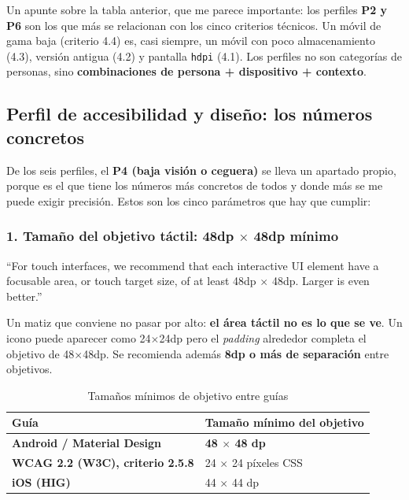 \documentclass[11pt,a4paper]{article}
\newcommand{\code}[1]{\texttt{\color{ink}#1}}
\begin{document}
	Un apunte sobre la tabla anterior, que me parece importante: los perfiles \textbf{P2 y P6} son los que más se relacionan con los cinco criterios técnicos. Un móvil de gama baja (criterio 4.4) es, casi siempre, un móvil con poco almacenamiento (4.3), versión antigua (4.2) y pantalla \code{hdpi} (4.1). Los perfiles no son categorías de personas, sino \textbf{combinaciones de persona + dispositivo + contexto}.
	
	\subsection{Perfil de accesibilidad y diseño: los números concretos}
	
	De los seis perfiles, el \textbf{P4 (baja visión o ceguera)} se lleva un apartado propio, porque es el que tiene los números más concretos de todos y donde más se me puede exigir precisión. Estos son los cinco parámetros que hay que cumplir:
	
	\subsubsection*{1. Tamaño del objetivo táctil: 48dp $\times$ 48dp mínimo}
	
	\enquote{For touch interfaces, we recommend that each interactive UI element have a focusable area, or touch target size, of at least 48dp $\times$ 48dp. Larger is even better.}
	
	Un matiz que conviene no pasar por alto: \textbf{el área táctil no es lo que se ve}. Un icono puede aparecer como 24$\times$24dp pero el \emph{padding} alrededor completa el objetivo de 48$\times$48dp. Se recomienda además \textbf{8dp o más de separación} entre objetivos.
	
	\begin{table}[htbp]
		\centering
		\small
		\begin{tabular}{@{}l l@{}}
			\toprule
			\rowcolor{primary}
			\textcolor{paper}{\sffamily\bfseries Guía} & \textcolor{paper}{\sffamily\bfseries Tamaño mínimo del objetivo} \\
			\midrule
			\textbf{Android / Material Design} & \textbf{48 $\times$ 48 dp} \\
			\rowcolor{soft}
			\textbf{WCAG 2.2 (W3C), criterio 2.5.8} & 24 $\times$ 24 píxeles CSS \\
			\textbf{iOS (HIG)} & 44 $\times$ 44 dp \\
			\bottomrule
		\end{tabular}
		\caption{Tamaños mínimos de objetivo entre guías}
	\end{table}
	
\end{document}
